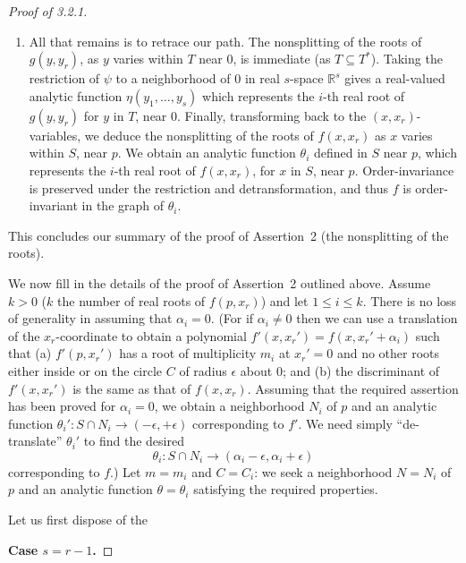 \documentclass[11pt]{article}
\theoremstyle{plain}
\theoremstyle{definition}
\newcommand{\R}{\mathbb{R}}
\begin{document}
\begin{proof}[Proof of 3.2.1]
\begin{enumerate}
\item All that remains is to retrace our path. The nonsplitting of the
roots of $g(y, y_r)$, as $y$ varies within $T$ near $0$, is immediate
(as $T \subseteq T^*$). Taking the restriction of $\psi$ to a
neighborhood of $0$ in real $s$-space $\R^s$ gives a real-valued
analytic function $\eta(y_1, \ldots, y_s)$ which represents the $i$-th
real root of $g(y, y_r)$ for $y$ in $T$, near $0$. Finally,
transforming back to the $(x, x_r)$-variables, we deduce the
nonsplitting of the roots of $f(x, x_r)$ as $x$ varies within $S$,
near $p$. We obtain an analytic function $\theta_i$ defined in $S$
near $p$, which represents the $i$-th real root of $f(x, x_r)$, for
$x$ in $S$, near $p$. Order-invariance is preserved under the
restriction and detransformation, and thus $f$ is order-invariant in
the graph of $\theta_i$.
\end{enumerate}

This concludes our summary of the proof of Assertion~2 (the
nonsplitting of the roots).

We now fill in the details of the proof of Assertion~2 outlined
above. Assume $k > 0$ ($k$ the number of real roots of $f(p, x_r)$)
and let $1 \le i \le k$. There is no loss of generality in assuming
that $\alpha_i = 0$. (For if $\alpha_i \ne 0$ then we can use a
translation of the $x_r$-coordinate to obtain a polynomial
$f'(x, x_r') = f(x, x_r' + \alpha_i)$ such that (a) $f'(p, x_r')$ has
a root of multiplicity $m_i$ at $x_r' = 0$ and no other roots either
inside or on the circle $C$ of radius $\epsilon$ about $0$; and (b)
the discriminant of $f'(x, x_r')$ is the same as that of $f(x, x_r)$.
Assuming that the required assertion has been proved for
$\alpha_i = 0$, we obtain a neighborhood $N_i$ of $p$ and an analytic
function $\theta_i' : S \cap N_i \to (-\epsilon, +\epsilon)$
corresponding to $f'$. We need simply ``de-translate'' $\theta_i'$
to find the desired
\[
\theta_i : S \cap N_i \to (\alpha_i - \epsilon, \alpha_i + \epsilon)
\]
corresponding to $f$.) Let $m = m_i$ and $C = C_i$: we seek a
neighborhood $N = N_i$ of $p$ and an analytic function
$\theta = \theta_i$ satisfying the required properties.

Let us first dispose of the

\medskip
\noindent \textbf{Case $s = r-1$.}
\medskip


\end{proof}
\end{document}
